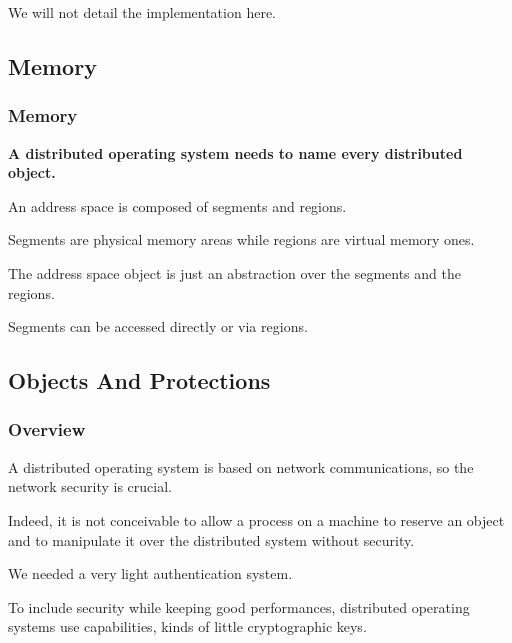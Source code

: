 {\begin{frame}
  \nl

  We will not detail the implementation here.
\end{frame}

%
%

\subsection{Memory}


\begin{frame}
  \frametitle{Memory}

  \textbf{A distributed operating system needs to name every
    distributed object.}

  \nl

  An address space is composed of segments and regions.

  \nl

  Segments are physical memory areas while regions are virtual memory
  ones.

  \nl

  The address space object is just an abstraction over the segments and
  the regions.

  \nl

  Segments can be accessed directly or via regions.
\end{frame}

%
%

\subsection{Objects And Protections}


\begin{frame}
  \frametitle{Overview}

  A distributed operating system is based on network communications, so
  the network security is crucial.

  \nl

  Indeed, it is not conceivable to allow a process on a machine
  to reserve an object and to manipulate it over the distributed
  system without security.

  \nl

  We needed a very light authentication system.

  \nl

  To include security while keeping good performances, distributed
  operating systems use capabilities, kinds of little cryptographic keys.
\end{frame}

}
